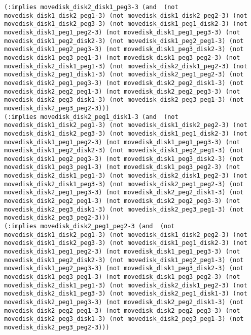 \documentclass[12pt,letterpaper]{ntdhw}
\begin{document}
\begin{enumerate}
\begin{enumerate}
\begin{lstlisting}[language=pddl, style=pddlstyle,
  basicstyle=\scriptsize]
(:implies movedisk_disk2_disk1_peg3-3 (and  (not movedisk_disk1_disk2_peg1-3) (not movedisk_disk1_disk2_peg2-3) (not movedisk_disk1_disk2_peg3-3) (not movedisk_disk1_peg1_disk2-3) (not movedisk_disk1_peg1_peg2-3) (not movedisk_disk1_peg1_peg3-3) (not movedisk_disk1_peg2_disk2-3) (not movedisk_disk1_peg2_peg1-3) (not movedisk_disk1_peg2_peg3-3) (not movedisk_disk1_peg3_disk2-3) (not movedisk_disk1_peg3_peg1-3) (not movedisk_disk1_peg3_peg2-3) (not movedisk_disk2_disk1_peg1-3) (not movedisk_disk2_disk1_peg2-3) (not movedisk_disk2_peg1_disk1-3) (not movedisk_disk2_peg1_peg2-3) (not movedisk_disk2_peg1_peg3-3) (not movedisk_disk2_peg2_disk1-3) (not movedisk_disk2_peg2_peg1-3) (not movedisk_disk2_peg2_peg3-3) (not movedisk_disk2_peg3_disk1-3) (not movedisk_disk2_peg3_peg1-3) (not movedisk_disk2_peg3_peg2-3)))
(:implies movedisk_disk2_peg1_disk1-3 (and  (not movedisk_disk1_disk2_peg1-3) (not movedisk_disk1_disk2_peg2-3) (not movedisk_disk1_disk2_peg3-3) (not movedisk_disk1_peg1_disk2-3) (not movedisk_disk1_peg1_peg2-3) (not movedisk_disk1_peg1_peg3-3) (not movedisk_disk1_peg2_disk2-3) (not movedisk_disk1_peg2_peg1-3) (not movedisk_disk1_peg2_peg3-3) (not movedisk_disk1_peg3_disk2-3) (not movedisk_disk1_peg3_peg1-3) (not movedisk_disk1_peg3_peg2-3) (not movedisk_disk2_disk1_peg1-3) (not movedisk_disk2_disk1_peg2-3) (not movedisk_disk2_disk1_peg3-3) (not movedisk_disk2_peg1_peg2-3) (not movedisk_disk2_peg1_peg3-3) (not movedisk_disk2_peg2_disk1-3) (not movedisk_disk2_peg2_peg1-3) (not movedisk_disk2_peg2_peg3-3) (not movedisk_disk2_peg3_disk1-3) (not movedisk_disk2_peg3_peg1-3) (not movedisk_disk2_peg3_peg2-3)))
(:implies movedisk_disk2_peg1_peg2-3 (and  (not movedisk_disk1_disk2_peg1-3) (not movedisk_disk1_disk2_peg2-3) (not movedisk_disk1_disk2_peg3-3) (not movedisk_disk1_peg1_disk2-3) (not movedisk_disk1_peg1_peg2-3) (not movedisk_disk1_peg1_peg3-3) (not movedisk_disk1_peg2_disk2-3) (not movedisk_disk1_peg2_peg1-3) (not movedisk_disk1_peg2_peg3-3) (not movedisk_disk1_peg3_disk2-3) (not movedisk_disk1_peg3_peg1-3) (not movedisk_disk1_peg3_peg2-3) (not movedisk_disk2_disk1_peg1-3) (not movedisk_disk2_disk1_peg2-3) (not movedisk_disk2_disk1_peg3-3) (not movedisk_disk2_peg1_disk1-3) (not movedisk_disk2_peg1_peg3-3) (not movedisk_disk2_peg2_disk1-3) (not movedisk_disk2_peg2_peg1-3) (not movedisk_disk2_peg2_peg3-3) (not movedisk_disk2_peg3_disk1-3) (not movedisk_disk2_peg3_peg1-3) (not movedisk_disk2_peg3_peg2-3)))

\end{lstlisting}
\end{enumerate}
\end{enumerate}
\end{document}
